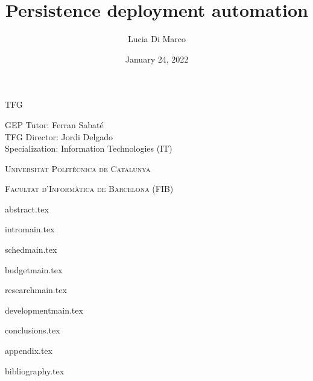 \documentclass[a4paper,10pt]{article}
\begin{document}

{\parskip=0pt
\title{\vspace{30mm}\textbf{\Large Persistence deployment automation}} 
\author{Lucia Di Marco}
\date{\small{January 24, 2022}}
\maketitle

\vspace{5mm}
\begin{center}
\centering
\textsc{TFG}
\vspace{5mm}

\textnormal{\small{GEP Tutor: Ferran Sabaté 
 \\ TFG Director: Jordi Delgado 
 \\ Specialization: Information Technologies (IT)}}

\vspace{10mm}
 
\textsc{Universitat Politècnica de Catalunya}

\textsc{Facultat d'Informàtica de Barcelona (FIB)}


\end{center}
}


\newpage
{} 
{abstract.tex}
\newpage

\tableofcontents
\newpage
{intromain.tex}

\pagebreak
{schedmain.tex}

\pagebreak
{budgetmain.tex}

\pagebreak
{researchmain.tex}

\pagebreak
{developmentmain.tex}

\pagebreak
{conclusions.tex}

\cleardoublepage


\listoftables

\pagebreak
{}
\listoffigures


\pagebreak
\appendix
{}
{appendix.tex}

\clearpage

{bibliography.tex}
\end{document}
